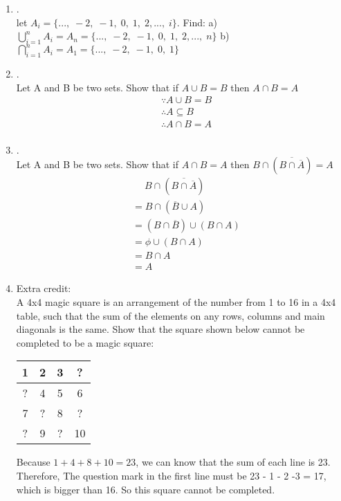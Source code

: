 \documentclass{article}
\theoremstyle{definition}
\theoremstyle{plain}
\begin{document}
\begin {enumerate}[itemindent=30pt,label=\bf Exercise {\arabic*}:]
\item .\\
let $A_{i} = \{...,\;-2,\;-1,\;0,\;1,\;2,...,\;i\}$. Find:
\subitem a) $\bigcup \limits_{i=1}^{n} A_{i} = A_{n} = \{...,\;-2,\;-1,\;0,\;1,\;2,...,\;n\}$
\subitem b) $\bigcap \limits_{i=1}^{n} A_{i} = A_{1} = \{...,\;-2,\;-1,\;0,\;1\}$
\item .\\
Let A and B be two sets. Show that if $A \cup B = B$ then $A \cap B = A$
\begin{align*}
	&\because A \cup B = B\\
	&\therefore A \subseteq B\\
	&\therefore A \cap B = A\\
\end{align*}
\newpage
\item .\\
Let A and B be two sets. Show that if $A \cap B = A$ then $B \cap (\overline{B \cap \overline{A}}) = A$
\begin{align*}
	&\quad\; B \cap (\overline{B \cap \overline{A}})\\
	&= B \cap (\overline{B} \cup A)\\
	&= (B \cap \overline{B}) \cup  (B \cap A)\\
	&= \phi \cup (B \cap A)\\
	&= B \cap A\\
	&= A
\end{align*}
\item Extra credit:\\
A 4x4 magic square is an arrangement of the number from 1 to 16 in a 4x4 table, such that the sum of the elements on any rows, columns and main diagonals is the same. Show that the square shown below cannot be completed to be a magic square:
\subitem 
\begin{tabular}{| c | c | c | c |}
\hline
	1&2&3&?\\
\hline
	?&4&5&6\\
\hline 
	7&?&8&?\\
\hline
	?& 9&?&10\\
\hline
\end{tabular}
\subitem  Because $1+4+8+10=23$, we can know that the sum of each line is 23.
\subitem Therefore, The question mark in the first line must be 23 - 1 - 2 -3 = 17, which is bigger than 16.
\subitem So this square cannot be completed.
\end{enumerate}
\end{document}
